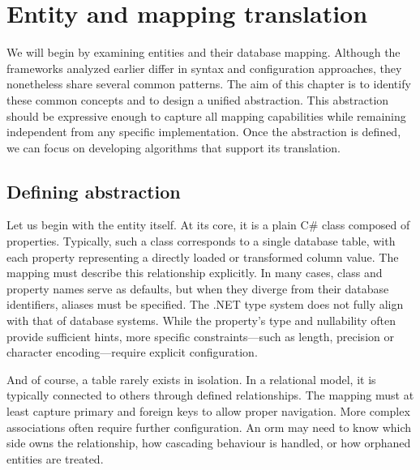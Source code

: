 \chapter{Entity and mapping translation}

We will begin by examining entities and their database mapping. Although the frameworks analyzed earlier differ in syntax and configuration approaches, they nonetheless share several common patterns. The aim of this chapter is to identify these common concepts and to design a unified abstraction. This abstraction should be expressive enough to capture all mapping capabilities while remaining independent from any specific implementation. Once the abstraction is defined, we can focus on developing algorithms that support its translation.

\section{Defining abstraction}

Let us begin with the entity itself. At its core, it is a plain C\# class composed of properties. Typically, such a class corresponds to a single database table, with each property representing a directly loaded or transformed column value. The mapping must describe this relationship explicitly. In many cases, class and property names serve as defaults, but when they diverge from their database identifiers, aliases must be specified. The .NET type system does not fully align with that of database systems. While the property's type and nullability often provide sufficient hints, more specific constraints---such as length, precision or character encoding---require explicit configuration.

And of course, a table rarely exists in isolation. In a relational model, it is typically connected to others through defined relationships. The mapping must at least capture primary and foreign keys to allow proper navigation. More complex associations often require further configuration. An \acrshort{orm} may need to know which side owns the relationship, how cascading behaviour is handled, or how orphaned entities are treated.

